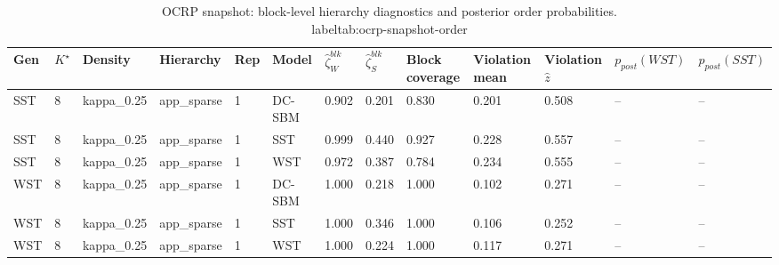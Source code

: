 \begin{table}[!h]
\centering
\caption{OCRP snapshot: block-level hierarchy diagnostics and posterior order probabilities.\\label{tab:ocrp-snapshot-order}}
\centering
\begin{tabular}[t]{lllllllllllll}
\toprule
Gen & $K^\star$ & Density & Hierarchy & Rep & Model & $\widehat\zeta_W^{blk}$ & $\widehat\zeta_S^{blk}$ & Block coverage & Violation mean & Violation $\hat z$ & $p_{post}(WST)$ & $p_{post}(SST)$\\
\midrule
SST & 8 & kappa_0.25 & app_sparse & 1 & DC-SBM & 0.902 & 0.201 & 0.830 & 0.201 & 0.508 & -- & --\\
SST & 8 & kappa_0.25 & app_sparse & 1 & SST & 0.999 & 0.440 & 0.927 & 0.228 & 0.557 & -- & --\\
SST & 8 & kappa_0.25 & app_sparse & 1 & WST & 0.972 & 0.387 & 0.784 & 0.234 & 0.555 & -- & --\\
WST & 8 & kappa_0.25 & app_sparse & 1 & DC-SBM & 1.000 & 0.218 & 1.000 & 0.102 & 0.271 & -- & --\\
WST & 8 & kappa_0.25 & app_sparse & 1 & SST & 1.000 & 0.346 & 1.000 & 0.106 & 0.252 & -- & --\\
WST & 8 & kappa_0.25 & app_sparse & 1 & WST & 1.000 & 0.224 & 1.000 & 0.117 & 0.271 & -- & --\\
\bottomrule
\end{tabular}
\end{table}
